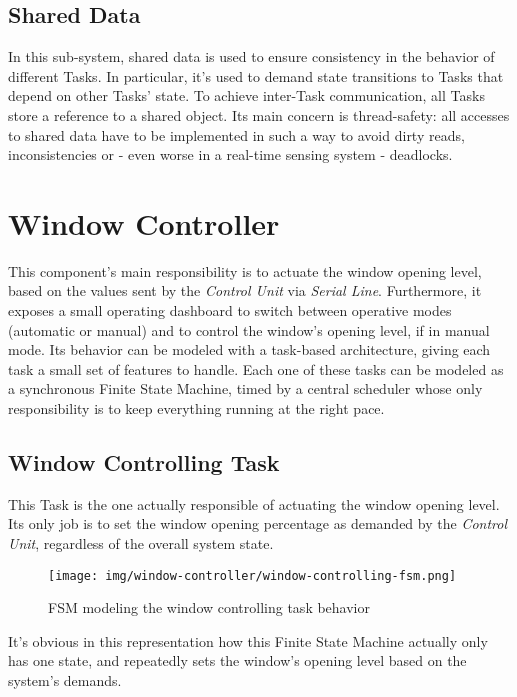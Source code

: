 \documentclass[a4paper,12pt]{report}
\begin{document}
		\subsection{Shared Data}
		In this sub-system, shared data is used to ensure consistency in the behavior of different Tasks. In particular, it's used to demand state transitions to Tasks that depend on other Tasks' state.
		\newline To achieve inter-Task communication, all Tasks store a reference to a shared object. Its main concern is thread-safety: all accesses to shared data have to be implemented in such a way to avoid dirty reads, inconsistencies or - even worse in a real-time sensing system - deadlocks.
	\section{Window Controller}
	This component's main responsibility is to actuate the window opening level, based on the values sent by the \textit{Control Unit} via \textit{Serial Line}. Furthermore, it exposes a small operating dashboard to switch between operative modes (automatic or manual) and to control the window's opening level, if in manual mode. Its behavior can be modeled with a task-based architecture, giving each task a small set of features to handle. Each one of these tasks can be modeled as a synchronous Finite State Machine, timed by a central scheduler whose only responsibility is to keep everything running at the right pace.
		\subsection{Window Controlling Task}
		This Task is the one actually responsible of actuating the window opening level. Its only job is to set the window opening percentage as demanded by the \textit{Control Unit}, regardless of the overall system state.
		\begin{figure}[H]
			\centering{}
			\texttt{[image: img/window-controller/window-controlling-fsm.png]}
			\caption{FSM modeling the window controlling task behavior}
			\label{img:window-controller/window-controlling-fsm}
		\end{figure}
		It's obvious in this representation how this Finite State Machine actually only has one state, and repeatedly sets the window's opening level based on the system's demands.
\end{document}
